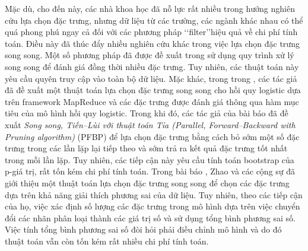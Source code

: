 Mặc dù, cho đến này, các nhà khoa học đã nỗ lực rất nhiều trong hướng nghiên cứu lựa chọn đặc trưng, nhưng dữ liệu từ các trường, các ngành khác nhau có thể quá phong phú ngay cả đối với các phương pháp \lq\lq filter\rq\rq hiệu quả về chi phí tính toán. Điều này đã thúc đẩy nhiều nghiên cứu khác trong việc lựa chọn đặc trưng song song. Một số phương pháp đã được đề xuất trong \cite{melab2006grid,de2006parallelizing,garcia2006parallel,guillen2009efficiency,lopez2006solve} sử dụng quy trình xử lý song song để đánh giá đồng thời nhiều đặc trưng. Tuy nhiên, các thuật toán này yêu cầu quyên truy cập vào toàn bộ dữ liệu. Mặc khác, trong trong \cite{singh2009parallel}, các tác giả đã đề xuất một thuật toán lựa chọn đặc trưng song song cho hồi quy logistic dựa trên framework MapReduce và các đặc trưng được đánh giá thông qua hàm mục tiêu của mô hình hồi quy logistic. Trong khi đó, các tác giả của bài báo \cite{tsamardinos2019greedy} đã đề xuất \textit{Song song, Tiến–Lùi với thuật toán Tỉa (Parallel, Forward–Backward with Pruning algorithm)} (PFBP) để lựa chọn đặc trưng bằng cách bỏ sớm một số đặc trưng trong các lần lặp lại tiếp theo và sớm trả ra kết quả đặc trưng tốt nhất trong mỗi lần lặp. Tuy nhiên, các tiếp cận này yêu cầu tính toán bootstrap của p-giá trị, rất tốn kém chi phí tính toán. Trong bài báo \cite{zhao2013massively}, Zhao và các cộng sự đã giới thiệu một thuật toán lựa chọn đặc trưng song song để chọn các đặc trưng dựa trên khả năng giải thích phương sai của dữ liệu. Tuy nhiên, theo các tiếp cận của họ, việc xác định số lượng các đặc trưng trong mô hình dựa trên việc chuyển đổi các nhãn phân loại thành các giá trị số và sử dụng tổng bình phương sai số. Việc tính tổng bình phương sai số đòi hỏi phải điều chỉnh mô hình và do đó thuật toán vẫn còn tốn kém rất nhiều chi phí tính toán.